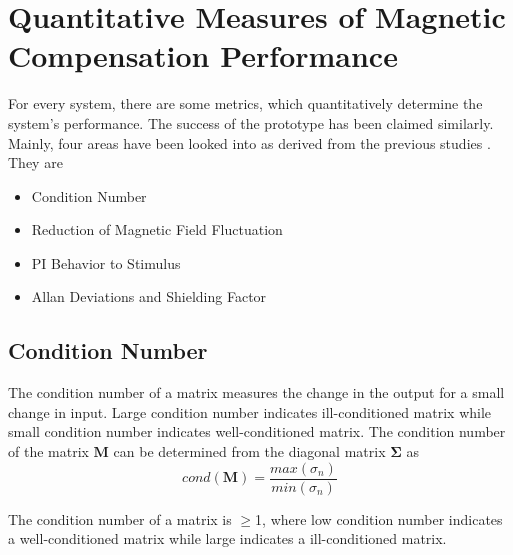 

 
 
% 





\section{Quantitative Measures of Magnetic Compensation Performance\label{sec:metrics}}
For every system, there are some metrics, which quantitatively determine the system's performance. The success of the prototype has been claimed similarly. Mainly, four areas have been looked into as derived from the previous studies \cite{bea,lins,rawlik}. They are

\begin{itemize}
    \item Condition Number
    \item Reduction of Magnetic Field Fluctuation
    \item PI Behavior to Stimulus
    \item Allan Deviations and Shielding Factor

\end{itemize}
\subsection{Condition Number}

The condition number of a matrix measures the change in the output for a small change in input. Large condition number indicates ill-conditioned matrix while small condition number indicates well-conditioned matrix. The condition number of the matrix $\bm{M}$ can be determined from the diagonal matrix $\bm{\Sigma}$ as 
 \begin{equation}\label{eq:cond}
     cond(\bm{M})=\frac{max(\sigma_n)}{min(\sigma_n)}
 \end{equation}

The condition number of a matrix is $\geq$1, where low condition number indicates a well-conditioned matrix while large indicates a ill-conditioned matrix.

